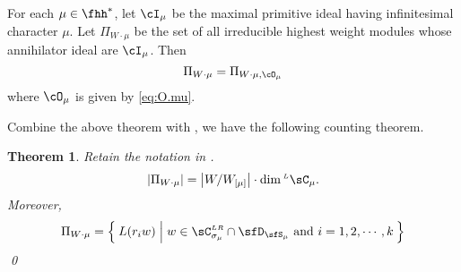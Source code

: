 \documentclass[12pt,a4paper]{amsart}
\def\abs#1{\left|{#1}\right|}
\newcommand{\sgn}{\operatorname{sgn}}
\numberwithin{equation}{section}
\newtheorem{thm}{Theorem}[section]
\theoremstyle{remark}
\DeclareMathOperator{\sspan}{span}
\def\Irr{\mathrm{Irr}}
\def\CLR{{\sC}^{\scriptscriptstyle LR}}
\def\LC{{}^{\scriptscriptstyle L}\sC}
\def\Coh{\mathrm{Coh}}
\def\leqL{\mathrel{\mathop{\leq}\limits_{\scriptscriptstyle L}}}
\def\leqR{\mathrel{\mathop{\leq}\limits_{\scriptscriptstyle R}}}
\def\approxLR{\mathrel{\mathop{\approx}\limits_{\scriptscriptstyle LR}}}
\begin{document}
For each  $\mu\in \fhh^{*}$,
let $\cI_{\mu}$ be the maximal primitive ideal having infinitesimal character
$\mu$.
Let
  $\Pi_{W\cdot \mu}$ be the set of all irreducible highest weight modules whose
  annihilator ideal are $\cI_{\mu}$.
  Then
  \[
    \Pi_{W\cdot \mu} = \Pi_{W\cdot \mu, \cO_{\mu}}
  \]
  where $\cO_{\mu}$ is given by \eqref{eq:O.mu}.


Combine the above theorem with , we have the following
counting theorem.
\begin{thm}
  Retain the notation in .   \[
    \abs{\Pi_{W\cdot \mu}} = \abs{W/W_{[\mu]}}\cdot
    \dim \LC_{\mu}.
  \]
  Moreover,
  \[
  \Pi_{W\cdot\mu} = \Set{L(r_{i}w)|w\in \CLR_{\sigma_{\mu}}\cap \sfD_{\sfS_{\mu}} \text{ and } i=1,2,\cdots,k}
  \]
  \qed
\end{thm}






\end{document}
